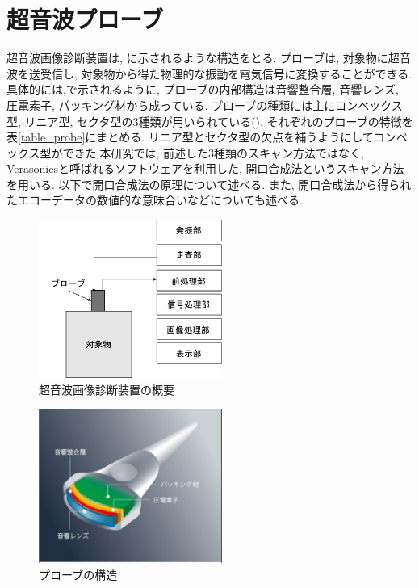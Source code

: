 \section{超音波プローブ}
超音波画像診断装置は, に示されるような構造をとる. プローブは, 対象物に超音波を送受信し, 対象物から得た物理的な振動を電気信号に変換することができる. 具体的には,で示されるように, プローブの内部構造は音響整合層, 音響レンズ, 圧電素子, パッキング材から成っている.  プローブの種類には主にコンベックス型, リニア型, セクタ型の3種類が用いられている(). それぞれのプローブの特徴を表\ref{table_probe}にまとめる. リニア型とセクタ型の欠点を補うようにしてコンベックス型ができた.本研究では, 前述した3種類のスキャン方法ではなく, Verasonicsと呼ばれるソフトウェアを利用した, 開口合成法というスキャン方法を用いる. 以下で開口合成法の原理について述べる. また, 開口合成法から得られたエコーデータの数値的な意味合いなどについても述べる. 
\begin{figure}[H]
  \begin{center}
    \includegraphics[width=60mm]{fig/ultradev.pdf}
  \end{center}
  \caption{超音波画像診断装置の概要}
\end{figure}
\begin{figure}[H]
  \begin{center}
    \includegraphics[width=60mm]{fig/img_probe.pdf}
  \end{center}
  \caption{プローブの構造}
\end{figure}
